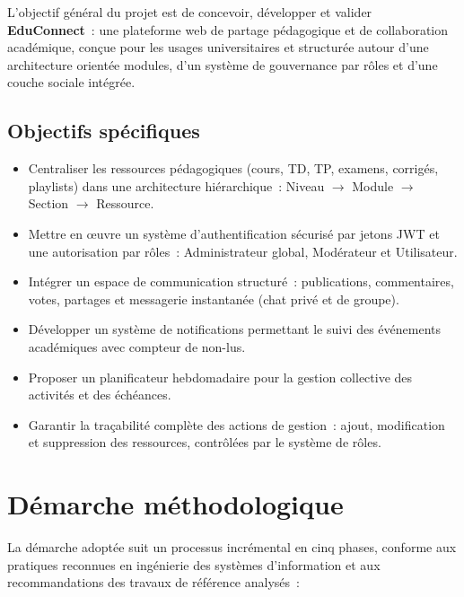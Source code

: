 ﻿\documentclass[12pt,a4paper,oneside]{report}
\begin{document}
L'objectif g\'en\'eral du projet est de concevoir, d\'evelopper et valider \textbf{EduConnect}~: une plateforme web de partage p\'edagogique et de collaboration acad\'emique, con\c{c}ue pour les usages universitaires et structur\'ee autour d'une architecture orient\'ee modules, d'un syst\`eme de gouvernance par r\^oles et d'une couche sociale int\'egr\'ee.

\subsection{Objectifs sp\'ecifiques}

\begin{itemize}
  \item[\textbf{OS1.}] Centraliser les ressources p\'edagogiques (cours, TD, TP, examens, corrig\'es, playlists) dans une architecture hi\'erarchique~: Niveau $\rightarrow$ Module $\rightarrow$ Section $\rightarrow$ Ressource.
  \item[\textbf{OS2.}] Mettre en \oe uvre un syst\`eme d'authentification s\'ecuris\'e par jetons JWT et une autorisation par r\^oles~: Administrateur global, Mod\'erateur et Utilisateur.
  \item[\textbf{OS3.}] Int\'egrer un espace de communication structur\'e~: publications, commentaires, votes, partages et messagerie instantan\'ee (chat priv\'e et de groupe).
  \item[\textbf{OS4.}] D\'evelopper un syst\`eme de notifications permettant le suivi des \'ev\'enements acad\'emiques avec compteur de non-lus.
  \item[\textbf{OS5.}] Proposer un planificateur hebdomadaire pour la gestion collective des activit\'es et des \'ech\'eances.
  \item[\textbf{OS6.}] Garantir la tra\c{c}abilit\'e compl\`ete des actions de gestion~: ajout, modification et suppression des ressources, contr\^ol\'ees par le syst\`eme de r\^oles.
\end{itemize}

\section{D\'emarche m\'ethodologique}
\label{sec:methodo}

La d\'emarche adopt\'ee suit un processus incr\'emental en cinq phases, conforme aux pratiques reconnues en ing\'enierie des syst\`emes d'information et aux recommandations des travaux de r\'ef\'erence analys\'es~:
\end{document}
